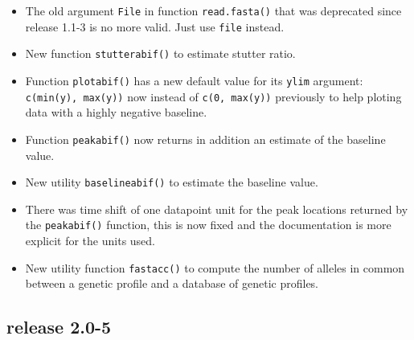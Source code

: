 \documentclass{article}
\begin{document}
\begin{itemize}

\item The old argument \texttt{File} in function \texttt{read.fasta()}
that was deprecated since release 1.1-3 is no more valid.
Just use \texttt{file} instead.

\item New function \texttt{stutterabif()} to estimate stutter ratio.

\item Function \texttt{plotabif()} has a new default value for its
\texttt{ylim} argument: \texttt{c(min(y), max(y))} now instead
of \texttt{c(0, max(y))} previously to help ploting data with
a highly negative baseline.

\item Function \texttt{peakabif()} now returns in addition an estimate
of the baseline value.

\item New utility \texttt{baselineabif()} to estimate the baseline
value.

\item There was time shift of one datapoint unit for the peak locations
returned by the \texttt{peakabif()} function, this is now fixed
and the documentation is more explicit for the units used.

\item New utility function \texttt{fastacc()} to compute the number
of alleles in common between a genetic profile and a database of
genetic profiles.

\end{itemize}

\subsection*{release 2.0-5}
\end{document}
